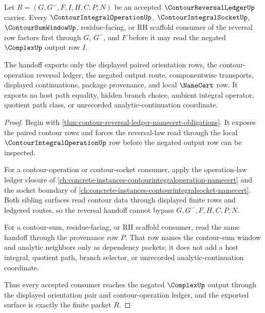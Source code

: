 \begin{theorem}
\label{thm:contour-reversal-ledger-contourintegral-handoff}
Let $R=(G,G^{-},F,I,H,C,P,N)$ be an accepted $\ContourReversalLedgerUp$ carrier. Every $\ContourIntegralOperationUp$, $\ContourIntegralSocketUp$, $\ContourSumWindowUp$, residue-facing, or RH scaffold consumer of the reversal row factors first through $G$, $G^{-}$, and $F$ before it may read the negated $\ComplexUp$ output row $I$.

The handoff exports only the displayed paired orientation rows, the contour-operation reversal ledger, the negated output route, componentwise transports, displayed continuations, package provenance, and local $\NameCert$ row. It exports no host path equality, hidden branch choice, ambient integral operator, quotient path class, or unrecorded analytic-continuation coordinate.
\end{theorem}
\begin{proof}
Begin with \autoref{thm:contour-reversal-ledger-namecert-obligations}. It exposes the paired contour rows and forces the reversal-law read through the local $\ContourIntegralOperationUp$ row before the negated output row can be inspected.

For a contour-operation or contour-socket consumer, apply the operation-law ledger closure of \autoref{ch:concrete-instances-contourintegraloperation-namecert} and the socket boundary of \autoref{ch:concrete-instances-contourintegralsocket-namecert}. Both sibling surfaces read contour data through displayed finite rows and ledgered routes, so the reversal handoff cannot bypass $G,G^{-},F,H,C,P,N$.

For a contour-sum, residue-facing, or RH scaffold consumer, read the same handoff through the provenance row $P$. That row names the contour-sum window and analytic neighbors only as dependency packets; it does not add a host integral, quotient path, branch selector, or unrecorded analytic-continuation coordinate.

Thus every accepted consumer reaches the negated $\ComplexUp$ output through the displayed orientation pair and contour-operation ledger, and the exported surface is exactly the finite packet $R$.
\end{proof}



